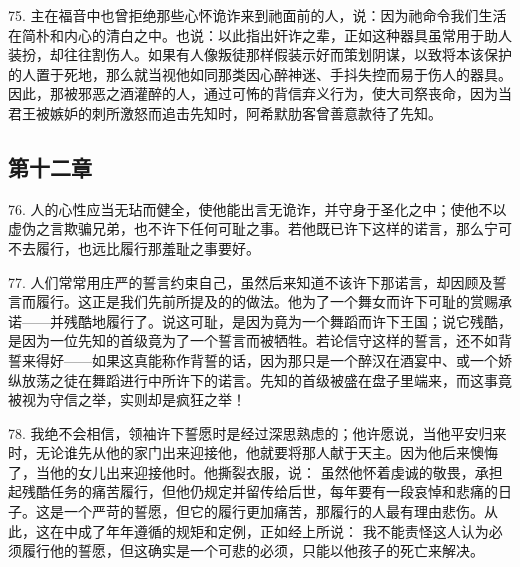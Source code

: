 75. 主在福音中也曾拒绝那些心怀诡诈来到祂面前的人，说：因为祂命令我们生活在简朴和内心的清白之中。也说：以此指出奸诈之辈，正如这种器具虽常用于助人装扮，却往往割伤人。如果有人像叛徒那样假装示好而策划阴谋，以致将本该保护的人置于死地，那么就当视他如同那类因心醉神迷、手抖失控而易于伤人的器具。因此，那被邪恶之酒灌醉的人，通过可怖的背信弃义行为，使大司祭丧命，因为当君王被嫉妒的刺所激怒而追击先知时，阿希默肋客曾善意款待了先知。\par


\subsection{第十二章}

\par

76. 人的心性应当无玷而健全，使他能出言无诡诈，并守身于圣化之中；使他不以虚伪之言欺骗兄弟，也不许下任何可耻之事。若他既已许下这样的诺言，那么宁可不去履行，也远比履行那羞耻之事要好。\par

77. 人们常常用庄严的誓言约束自己，虽然后来知道不该许下那诺言，却因顾及誓言而履行。这正是我们先前所提及的的做法。他为了一个舞女而许下可耻的赏赐承诺——并残酷地履行了。说这可耻，是因为竟为一个舞蹈而许下王国；说它残酷，是因为一位先知的首级竟为了一个誓言而被牺牲。若论信守这样的誓言，还不如背誓来得好——如果这真能称作背誓的话，因为那只是一个醉汉在酒宴中、或一个娇纵放荡之徒在舞蹈进行中所许下的诺言。先知的首级被盛在盘子里端来，而这事竟被视为守信之举，实则却是疯狂之举！\par

78. 我绝不会相信，领袖许下誓愿时是经过深思熟虑的；他许愿说，当他平安归来时，无论谁先从他的家门出来迎接他，他就要将那人献于天主。因为他后来懊悔了，当他的女儿出来迎接他时。他撕裂衣服，说： 虽然他怀着虔诚的敬畏，承担起残酷任务的痛苦履行，但他仍规定并留传给后世，每年要有一段哀悼和悲痛的日子。这是一个严苛的誓愿，但它的履行更加痛苦，那履行的人最有理由悲伤。从此，这在中成了年年遵循的规矩和定例，正如经上所说： 我不能责怪这人认为必须履行他的誓愿，但这确实是一个可悲的必须，只能以他孩子的死亡来解决。\par

